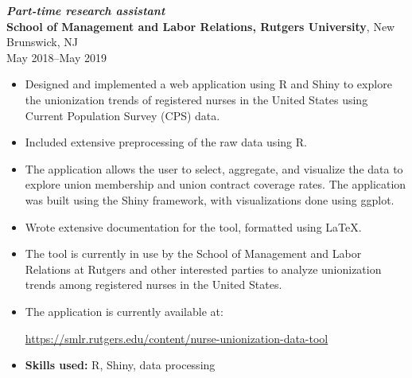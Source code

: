 \documentclass[letterpaper,12pt]{article}
\begin{document}
\textit{\textbf{Part-time research assistant}} \\
\textbf{School of Management and Labor Relations, Rutgers University},
New Brunswick, NJ \\
May 2018--May 2019
\begin{itemize}
\item Designed and implemented a web application using R and Shiny to
  explore the unionization trends of registered nurses in the United
  States using Current Population Survey (CPS) data.
\item Included extensive preprocessing of the raw data using R.
\item The application allows the user to select, aggregate, and
  visualize the data to explore union membership and union contract
  coverage rates. The application was built using the Shiny framework,
  with visualizations done using ggplot.
\item Wrote extensive documentation for the tool, formatted using
  \LaTeX.
\item The tool is currently in use by the School of Management and
  Labor Relations at Rutgers and other interested parties to analyze
  unionization trends among registered nurses in the United States.
\item The application is currently available at:
  \begin{center}
    \url{https://smlr.rutgers.edu/content/nurse-unionization-data-tool}
  \end{center}
\item \textbf{Skills used:} R, Shiny, data processing
\end{itemize}

\iffalse
\textit{\textbf{Independent mathematics tutor}} \\
\textbf{Mercer County Community College},
West Windsor, NJ \\
May 2017--July 2017
\begin{itemize}
\item Established an independent tutoring service.
\item Tutored students from Mercer County Community College in
  mathematics (mainly calculus and precalculus).
\end{itemize}
\fi
\end{document}
